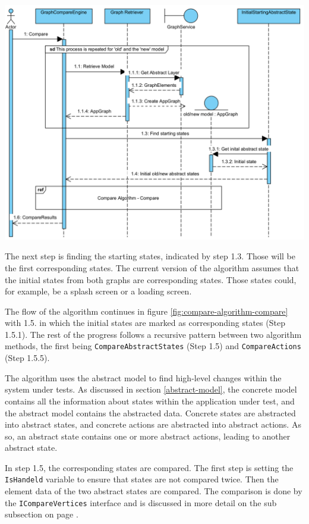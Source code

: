 \begingroup
\captionsetup{type=figure}
\includegraphics[scale=0.9]{content/5-Results/Images/Compare-algorithm-start.png}
\label{fig:compare-algorithm-start}
\endgroup

The next step is finding the starting states, indicated by step 1.3. Those will be the first corresponding states. The current version of the algorithm assumes that the initial states from both graphs are corresponding states. Those states could, for example, be a splash screen or a loading screen.

The flow of the algorithm continues in figure \ref{fig:compare-algorithm-compare} with 1.5. in which the initial states are marked as corresponding states (Step 1.5.1). The rest of the progress follows a recursive pattern between two algorithm methods, the first being \verb|CompareAbstractStates| (Step 1.5) and \verb|CompareActions| (Step 1.5.5).

The algorithm uses the abstract model to find high-level changes within the system under tests. As discussed in section \ref{abstract-model}, the concrete model contains all the information about states within the application under test, and the abstract model contains the abstracted data. Concrete states are abstracted into abstract states, and concrete actions are abstracted into abstract actions. As so, an abstract state contains one or more abstract actions, leading to another abstract state.
 
In step 1.5, the corresponding states are compared. The first step is setting the \verb|IsHandeld| variable to ensure that states are not compared twice. Then the element data of the two abstract states are compared. The comparison is done by the \verb|ICompareVertices| interface and is discussed in more detail on the sub subsection on page \pageref{sec:i-compare-vertices}.

